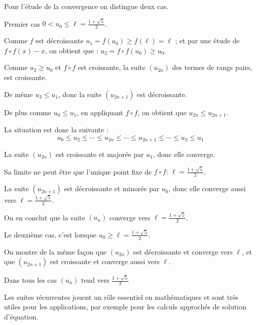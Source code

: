 Pour l'étude de la convergence on distingue deux cas.

 Premier cas $0 < u_0 \le \ell = \frac{1+\sqrt{5}}{2}$.
 
 \change
 
  Comme $f$ est décroissante  $u_1 = f(u_0) \ge f(\ell)=\ell$ ; et par une étude de $f\circ f(x)-x$, on obtient que  :  
  $u_2 = f\circ f(u_0) \ge u_0$.

  \change
  
  Comme $u_2 \ge u_0$ et $f\circ f$ est croissante, la suite $(u_{2n})$ des termes de rangs pairs, est croissante. 

  \change
   De même $u_3  \le u_1$, donc la suite $(u_{2n+1})$ est décroissante. 
   
   \change
   
  De plus comme  $u_0 \le u_1$, en appliquant $f\circ f$, on obtient que $u_{2n} \le u_{2n+1}$.
  
  \change
  
  La situation est donc la suivante :
  $$u_0 \le u_2 \le \cdots \le u_{2n} \le \cdots \le u_{2n+1} \le \cdots \le u_3 \le u_1$$
  
  \change
  
  La suite $(u_{2n})$ est croissante et majorée par $u_1$, donc elle converge. 
  
  \change
  
  Sa limite ne peut
  être que l'unique point fixe de $f\circ f$: $\ell = \frac{1+\sqrt{5}}{2}$.
  
  \change
  
   La suite $(u_{2n+1})$ est décroissante et minorée par $u_0$, donc elle converge aussi vers 
   $\ell = \frac{1+\sqrt{5}}{2}$.
   

\change
   
   On en conclut que la suite $(u_{n})$ converge vers $\ell = \frac{1+\sqrt{5}}{2}$.
   
\change

\change

Le deuxième cas, c'est lorsque $u_0 \ge \ell = \frac{1+\sqrt{5}}{2}$.

\change  

  On montre de la même façon que $(u_{2n})$ est décroissante et converge vers $\ell$,
  et que $(u_{2n+1})$ est croissante et converge aussi vers $\ell$.
  

Dans tous les cas $(u_n)$ tend vers $\frac{1+\sqrt{5}}{2}$

\diapo

Les suites récurrentes jouent un rôle essentiel en mathématiques et sont très utiles pour les
applications, par exemple pour les calculs approchés de solution d'équation.



